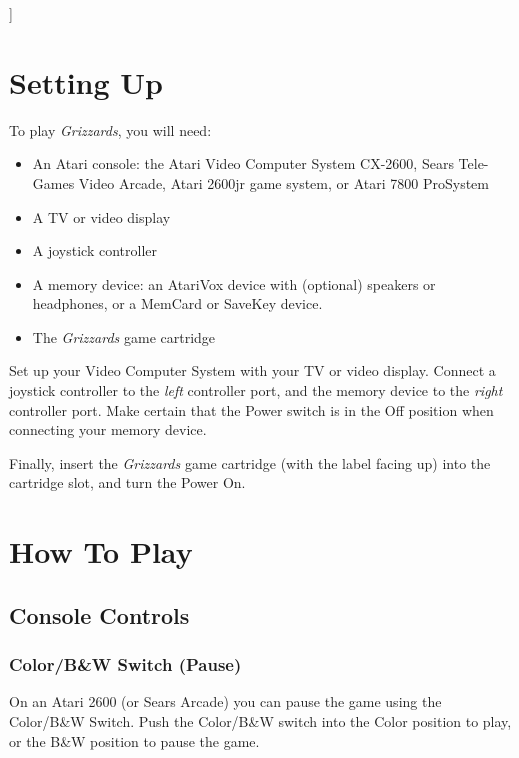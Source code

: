 \documentclass[10pt,twocolumn,openany,article]{memoir}
\begin{document}
]
\let\cleardoublepage\clearpage


\mainmatter

\tableofcontents

\chapter{Setting Up}\label{Setting Up}

To play \textit{Grizzards}, you will need:

\begin{itemize}
\item An Atari  console: the Atari Video Computer  System CX-2600, Sears
  Tele-Games  Video Arcade,  Atari  2600jr game  system,  or Atari  7800
  ProSystem
\item A TV or video display
\item A joystick controller
\item A  memory device: an  AtariVox device with (optional)  speakers or
  headphones, or a MemCard or SaveKey device.
\item The \textit{Grizzards} game cartridge
\end{itemize}

Set  up your  Video  Computer  System with  your  TV  or video  display.
Connect a  joystick controller to  the \emph{left} controller  port, and
the memory device to the \emph{right} controller port. Make certain that
the  Power  switch   is  in  the  Off  position   when  connecting  your
memory device.

Finally, insert  the \textit{Grizzards}  game cartridge (with  the label
facing up) into the cartridge slot, and turn the Power On.

\vfill

\chapter{How To Play}

\section{Console Controls}

\ifdefined\TVSECAM
\else

\subsection{Color/B\&W Switch (Pause)}

On an  Atari 2600  (or Sears Arcade)  you can pause  the game  using the
Color/B\&W Switch. Push the Color/B\&W switch into the Color position to
play, or the B\&W position to pause the game.
\end{document}
